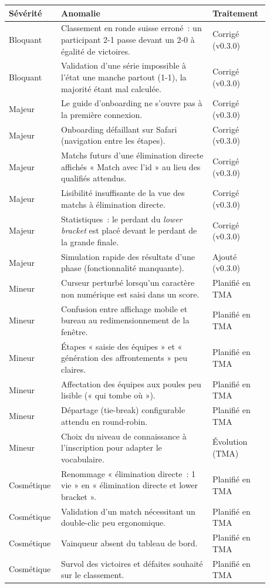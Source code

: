 {\small
\renewcommand{\arraystretch}{1.3}
\begin{longtable}{|>{\raggedright\arraybackslash}p{0.15\linewidth}|>{\raggedright\arraybackslash}p{0.55\linewidth}|>{\raggedright\arraybackslash}p{0.18\linewidth}|}
    \hline
    \textbf{Sévérité} & \textbf{Anomalie} & \textbf{Traitement} \\
    \hline
    \endhead
    Bloquant & Classement en ronde suisse erroné~: un participant 2-1 passe devant un 2-0 à égalité de victoires. & Corrigé (v0.3.0) \\
    \hline
    Bloquant & Validation d'une série impossible à l'état une manche partout (1-1), la majorité étant mal calculée. & Corrigé (v0.3.0) \\
    \hline
    Majeur & Le guide d'onboarding ne s'ouvre pas à la première connexion. & Corrigé (v0.3.0) \\
    \hline
    Majeur & Onboarding défaillant sur Safari (navigation entre les étapes). & Corrigé (v0.3.0) \\
    \hline
    Majeur & Matchs futurs d'une élimination directe affichés « Match avec l'id » au lieu des qualifiés attendus. & Corrigé (v0.3.0) \\
    \hline
    Majeur & Lisibilité insuffisante de la vue des matchs à élimination directe. & Corrigé (v0.3.0) \\
    \hline
    Majeur & Statistiques~: le perdant du \emph{lower bracket} est placé devant le perdant de la grande finale. & Corrigé (v0.3.0) \\
    \hline
    Majeur & Simulation rapide des résultats d'une phase (fonctionnalité manquante). & Ajouté (v0.3.0) \\
    \hline
    Mineur & Curseur perturbé lorsqu'un caractère non numérique est saisi dans un score. & Planifié en TMA \\
    \hline
    Mineur & Confusion entre affichage mobile et bureau au redimensionnement de la fenêtre. & Planifié en TMA \\
    \hline
    Mineur & Étapes « saisie des équipes » et « génération des affrontements » peu claires. & Planifié en TMA \\
    \hline
    Mineur & Affectation des équipes aux poules peu lisible (« qui tombe où »). & Planifié en TMA \\
    \hline
    Mineur & Départage (tie-break) configurable attendu en round-robin. & Planifié en TMA \\
    \hline
    Mineur & Choix du niveau de connaissance à l'inscription pour adapter le vocabulaire. & Évolution (TMA) \\
    \hline
    Cosmétique & Renommage « élimination directe~: 1 vie » en « élimination directe et lower bracket ». & Planifié en TMA \\
    \hline
    Cosmétique & Validation d'un match nécessitant un double-clic peu ergonomique. & Planifié en TMA \\
    \hline
    Cosmétique & Vainqueur absent du tableau de bord. & Planifié en TMA \\
    \hline
    Cosmétique & Survol des victoires et défaites souhaité sur le classement. & Planifié en TMA \\
    \hline
\end{longtable}
}

